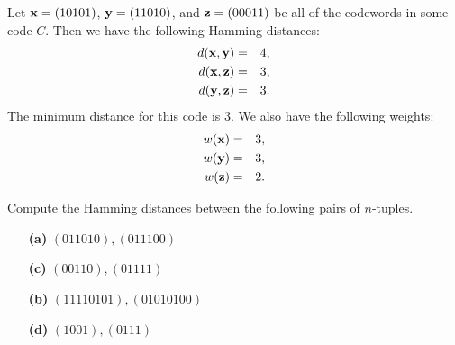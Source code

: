 \begin{example}{}
Let ${\bold x} = (10101)$, ${\bold y} = (11010)$, and ${\bold z} =
(00011)$ be all of the codewords in some code $C$. Then we have the
following Hamming distances: 
\begin{eqnarray*}
d({\bold x},{\bold y}) & = & 4, \\
d({\bold x},{\bold z}) & = & 3, \\
d({\bold y},{\bold z}) & = & 3.
\end{eqnarray*}
The minimum distance  for this code is 3. We also have the
following weights: 
\begin{eqnarray*}
w({\bold x}) & = & 3, \\
w({\bold y}) & = & 3, \\
w({\bold z}) & = & 2.
\end{eqnarray*}
\end{example}
 
 \begin{exercise}{}
Compute the Hamming distances between the following pairs of
$n$-tuples. 
 
\vspace{3pt}        %
 
\hspace{-7pt}
\begin{minipage}[t]{4.6in}
\noindent
\begin{minipage}[t]{2.25in}
\begin{itemize}
 
 \item[{\bf (a)}]
$(011010), (011100)$
 
 \item[{\bf (c)}]
$(00110), (01111)$
 
 
\end{itemize}
\end{minipage} \hfill
\begin{minipage}[t]{2.25in}
\begin{itemize}
 
 \item[{\bf (b)}]
$(11110101), (01010100)$
 
 \item[{\bf (d)}]
$(1001), (0111)$
 
 
\end{itemize}
\end{minipage}
\end{minipage}
 \end{exercise} 
 
